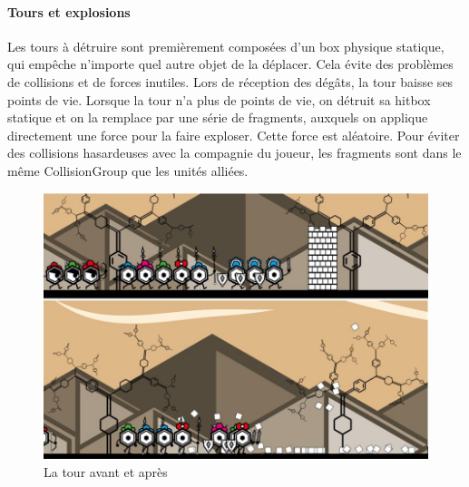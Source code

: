 \documentclass[a4paper,10pt]{article}
\begin{document}
  \paragraph{Tours et explosions}
  Les tours à détruire sont premièrement composées d'un box physique statique, qui empêche n'importe quel autre objet de la déplacer. Cela évite des problèmes de collisions et de forces inutiles. Lors de réception des dégâts, la tour baisse ses points de vie. Lorsque la tour n'a plus de points de vie, on détruit sa hitbox statique et on la remplace par une série de fragments, auxquels on applique directement une force pour la faire exploser. Cette force est aléatoire. Pour éviter des collisions hasardeuses avec la compagnie du joueur, les fragments sont dans le même CollisionGroup que les unités alliées.
 \begin{figure}[!h]
 \centering
 \vspace{-10pt}
 \includegraphics[scale=0.45]{images/towers}
 \caption{La tour avant et après}
 \end{figure}

  
\end{document}
